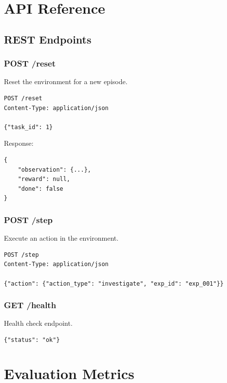\documentclass[12pt,a4paper]{article}
\begin{document}
\section{API Reference}

\subsection{REST Endpoints}

\subsubsection{POST /reset}

Reset the environment for a new episode.

\begin{lstlisting}[caption={Reset Request}]
POST /reset
Content-Type: application/json

{"task_id": 1}
\end{lstlisting}

Response:
\begin{lstlisting}[caption={Reset Response}]
{
    "observation": {...},
    "reward": null,
    "done": false
}
\end{lstlisting}

\subsubsection{POST /step}

Execute an action in the environment.

\begin{lstlisting}[caption={Step Request}]
POST /step
Content-Type: application/json

{"action": {"action_type": "investigate", "exp_id": "exp_001"}}
\end{lstlisting}

\subsubsection{GET /health}

Health check endpoint.

\begin{lstlisting}[caption={Health Response}]
{"status": "ok"}
\end{lstlisting}

\section{Evaluation Metrics}
\end{document}
